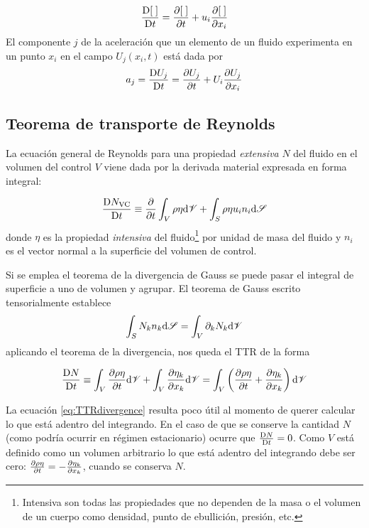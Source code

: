\[
\frac{\textrm{D} [\;]}{\textrm{D} t}=\frac{\partial [\;]}{\partial t}+u_i\frac{\partial [\;]}{\partial x_i}
\]
 El componente $j$ de la aceleración que un elemento de un fluido experimenta en un punto $x_i$ en el campo $U_j(x_i,t)$ está dada por
\[
a_j=\frac{\textrm{D} U_j}{\textrm{D} t}=\frac{\partial U_j}{\partial t}+U_i\frac{\partial U_j}{\partial x_i}
\]

\subsection{Teorema de transporte de Reynolds}

La ecuación general de Reynolds para una propiedad \textit{extensiva} $N$ del fluido en el volumen del control $V$ viene dada por la derivada material expresada en forma integral:

\begin{equation} \label{eq:TTRgeneral}
    \frac{\textrm{D} N_{\textrm{VC}}}{\textrm{D} t} \equiv \frac{\partial     }{\partial t} \int_{V} \rho \eta \textrm{d} \mathscr{V} + \int_{S}\rho \eta u_i n_i \textrm{d} \mathscr{S}
\end{equation}
donde $\eta$ es la propiedad \textit{intensiva} del fluido\footnote{Intensiva son todas las propiedades que no dependen de la masa o el volumen de un cuerpo como densidad, punto de ebullición, presión, etc.} por unidad de masa del fluido y $n_i$ es el vector normal a la superficie del volumen de control.

Si se emplea el teorema de la divergencia de Gauss se puede pasar el integral de superficie a uno de volumen y agrupar. El teorema de Gauss escrito tensorialmente establece
\[
\int_{S}  N_k n_k \textrm{d} \mathscr{S} = \int_{V} \partial_k N_k \textrm{d} \mathscr{V}
\]
aplicando el teorema de la divergencia, nos queda el TTR de la forma

\begin{equation} \label{eq:TTRdivergence}
\frac{\textrm{D} N}{\textrm{D} t} \equiv \int_{V} \frac{\partial \rho \eta}{\partial t}\textrm{d} \mathscr{V} +\int_V \frac{\partial \eta_k}{\partial x_k} \textrm{d} \mathscr{V}=\int_V\left(\frac{\partial \rho \eta}{\partial t} + \frac{\partial \eta_k}{\partial x_k}\right)\textrm{d} \mathscr{V}
\end{equation}

La ecuación \ref{eq:TTRdivergence} resulta poco útil al momento de querer calcular lo que está adentro del integrando. En el caso de que se conserve la cantidad $N$ (como podría ocurrir en régimen estacionario) ocurre que $\frac{\textrm{D} N}{\textrm{D} t}=0$. Como $V$ está definido como un volumen arbitrario lo que está adentro del integrando debe ser cero: $\frac{\partial \rho \eta}{\partial t} = - \frac{\partial \eta_k}{\partial x_k}$, cuando se conserva $N$.

